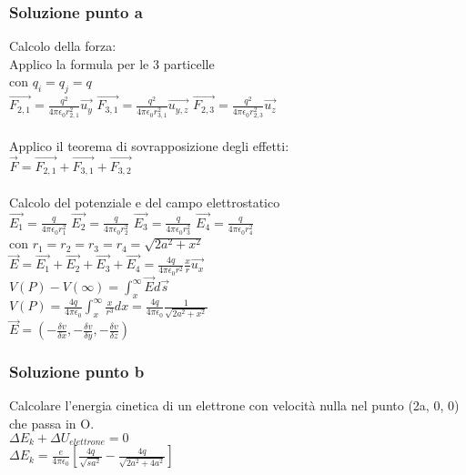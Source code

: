 \documentclass[../../main.tex]{subfiles}
\begin{document}
\subsubsection*{Soluzione punto a}
Calcolo della forza:
\\Applico la formula per le 3 particelle
\\con $q_i = q_j = q $ 
\\$\vec{F_{2,1}} = \frac{q^2}{4\pi\epsilon_0r_{2,1}^2}\vec{u_{y}}$
$\vec{F_{3,1}} = \frac{q^2}{4\pi\epsilon_0r_{3,1}^2}\vec{u_{y,z}}$
$\vec{F_{2,3}} = \frac{q^2}{4\pi\epsilon_0r_{2,3}^2}\vec{u_{z}}$
\\\\Applico il teorema di sovrapposizione degli effetti:
\\$\vec{F} = \vec{F_{2, 1}} +\vec{F_{3, 1}} + \vec{F_{3, 2}}$
\\\\Calcolo del potenziale e del campo elettrostatico
\\$\vec{E_1} = \frac{q}{4\pi\epsilon_0r_1^2}$
$\vec{E_2} = \frac{q}{4\pi\epsilon_0r_2^2}$
$\vec{E_3} = \frac{q}{4\pi\epsilon_0r_3^2}$
$\vec{E_4} = \frac{q}{4\pi\epsilon_0r_4^2}$
\\con $r_1 = r_2 = r_3 = r_4 = \sqrt{2a^2+x^2}$
\\$\vec{E} = \vec{E_1} +\vec{E_2} + \vec{E_3} +\vec{E_4} = \frac{4q}{4\pi\epsilon_0r^2}\frac{x}{r}\vec{u_x}$
\\$V(P) - V(\infty) = \int_x^\infty \vec{E}d\vec{s}$
\\$V(P) = \frac{4q}{4\pi\epsilon_0}\int_x^\infty \frac{x}{r^3}dx = \frac{4q}{4\pi\epsilon_0}\frac{1}{\sqrt{2a^2+x^2}}$
\\$\vec{E} = \left(-\frac{\delta v}{\delta x}, -\frac{\delta v}{\delta y},-\frac{\delta v}{\delta z}\right)$

\subsubsection*{Soluzione punto b}
Calcolare l'energia cinetica di un elettrone con velocità nulla nel punto (2a, 0, 0) che passa in O.
\\$\Delta E_k + \Delta U_{elettrone} = 0 $
\\$\Delta E_k = \frac{e}{4\pi\epsilon_0}\left[\frac{4q}{\sqrt{sa^2}}- \frac{4q}{\sqrt{2a^2 + 4a^2}}\right]$
\newpage
\end{document}
